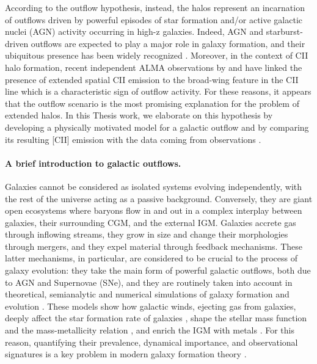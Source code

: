 \documentclass[12pt]{article}
\begin{document}
According to the outflow hypothesis, instead, the halos represent an incarnation of outflows driven by powerful episodes of star formation and/or active galactic nuclei (AGN) activity occurring in high-z galaxies. Indeed, AGN and starburst-driven outflows are expected to play a major role in galaxy formation, and their ubiquitous presence has been widely recognized \citep[see e.g.][]{Veilleux:2005ia}. Moreover, in the context of CII halo formation, recent independent ALMA observations by \citet{ginolfi:2019} and \citet{herrera2021kiloparsec} have linked the presence of extended spatial CII emission to the broad-wing feature in the CII line which is a characteristic sign of outflow activity. For these reasons, it appears that the outflow scenario is the most promising explanation for the problem of extended halos. In this Thesis work, we elaborate on this hypothesis by developing a physically motivated model for a galactic outflow and by comparing its resulting [CII] emission with the data coming from observations \citep{Fujimoto19, ginolfi:2019, Fujimoto:2020qzo}.



\paragraph{A brief introduction to galactic outflows.}

Galaxies cannot be considered as isolated systems evolving independently, with the rest of the universe acting as a passive background. Conversely, they are giant open ecosystems where baryons flow in and out in a complex interplay between galaxies, their surrounding CGM, and the external IGM. Galaxies accrete gas through inflowing streams, they grow in size and change their morphologies through mergers, and they expel material through feedback mechanisms. These latter mechanisms, in particular, are considered to be crucial to the process of galaxy evolution: they take the main form of powerful galactic outflows, both due to AGN and Supernovae (SNe), and they are routinely taken into account in theoretical, semianalytic and numerical simulations of galaxy formation and evolution \citep{Springel:2005nw, Vogelsberger:2014kha, Sijacki:2014yfa,schaye2015, Hopkins18}. These models show how galactic winds, ejecting gas from galaxies, deeply affect the star formation rate of galaxies \citep{Kormendy:2013dxa}, shape the stellar mass function and the mass-metallicity relation  \citep{dekelsilk, Finlator:2007mh}, and enrich the IGM with metals \citep{Aguirre:2001ay}. For this reason, quantifying their prevalence, dynamical importance, and observational signatures is a key problem in modern galaxy formation theory \citep[see e.g.][]{heckman2017galactic}.
\end{document}
